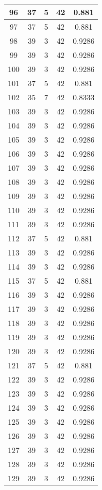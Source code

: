 \documentclass[letterpaper, 12pt]{article}
\begin{document}
\begin{longtable}{|c|c|c|c|c|}
\hline
96 & 37 & 5 & 42 & 0.881 \\
\hline
97 & 37 & 5 & 42 & 0.881 \\
\hline
98 & 39 & 3 & 42 & 0.9286 \\
\hline
99 & 39 & 3 & 42 & 0.9286 \\
\hline
100 & 39 & 3 & 42 & 0.9286 \\
\hline
101 & 37 & 5 & 42 & 0.881 \\
\hline
102 & 35 & 7 & 42 & 0.8333 \\
\hline
103 & 39 & 3 & 42 & 0.9286 \\
\hline
104 & 39 & 3 & 42 & 0.9286 \\
\hline
105 & 39 & 3 & 42 & 0.9286 \\
\hline
106 & 39 & 3 & 42 & 0.9286 \\
\hline
107 & 39 & 3 & 42 & 0.9286 \\
\hline
108 & 39 & 3 & 42 & 0.9286 \\
\hline
109 & 39 & 3 & 42 & 0.9286 \\
\hline
110 & 39 & 3 & 42 & 0.9286 \\
\hline
111 & 39 & 3 & 42 & 0.9286 \\
\hline
112 & 37 & 5 & 42 & 0.881 \\
\hline
113 & 39 & 3 & 42 & 0.9286 \\
\hline
114 & 39 & 3 & 42 & 0.9286 \\
\hline
115 & 37 & 5 & 42 & 0.881 \\
\hline
116 & 39 & 3 & 42 & 0.9286 \\
\hline
117 & 39 & 3 & 42 & 0.9286 \\
\hline
118 & 39 & 3 & 42 & 0.9286 \\
\hline
119 & 39 & 3 & 42 & 0.9286 \\
\hline
120 & 39 & 3 & 42 & 0.9286 \\
\hline
121 & 37 & 5 & 42 & 0.881 \\
\hline
122 & 39 & 3 & 42 & 0.9286 \\
\hline
123 & 39 & 3 & 42 & 0.9286 \\
\hline
124 & 39 & 3 & 42 & 0.9286 \\
\hline
125 & 39 & 3 & 42 & 0.9286 \\
\hline
126 & 39 & 3 & 42 & 0.9286 \\
\hline
127 & 39 & 3 & 42 & 0.9286 \\
\hline
128 & 39 & 3 & 42 & 0.9286 \\
\hline
129 & 39 & 3 & 42 & 0.9286 \\

\end{longtable}
\end{document}
